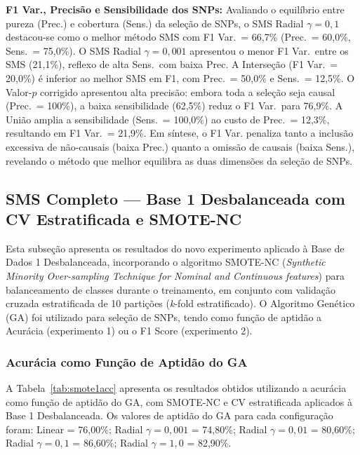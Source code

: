 \documentclass[12pt,a4paper]{article}
\newcommand{\novo}[1]{\textcolor{corNova}{#1}}
\begin{document}
\novo{\textbf{F1 Var., Precisão e Sensibilidade dos SNPs:} Avaliando o equilíbrio entre pureza (Prec.) e cobertura (Sens.) da seleção de SNPs, o SMS Radial $\gamma=0{,}1$ destacou-se como o melhor método SMS com F1 Var.\ = 66,7\% (Prec.\ = 60,0\%, Sens.\ = 75,0\%). O SMS Radial $\gamma=0{,}001$ apresentou o menor F1 Var.\ entre os SMS (21,1\%), reflexo de alta Sens.\ com baixa Prec. A Interseção (F1 Var.\ = 20,0\%) é inferior ao melhor SMS em F1, com Prec.\ = 50,0\% e Sens.\ = 12,5\%. O Valor-$p$ corrigido apresentou alta precisão: embora toda a seleção seja causal (Prec.\ = 100\%), a baixa sensibilidade (62,5\%) reduz o F1 Var.\ para 76,9\%. A União amplia a sensibilidade (Sens.\ = 100,0\%) ao custo de Prec.\ = 12,3\%, resultando em F1 Var.\ = 21,9\%. Em síntese, o F1 Var. penaliza tanto a inclusão excessiva de não-causais (baixa Prec.) quanto a omissão de causais (baixa Sens.), revelando o método que melhor equilibra as duas dimensões da seleção de SNPs.}
\subsection{\novo{SMS Completo --- Base 1 Desbalanceada com CV Estratificada e SMOTE-NC}}

\novo{Esta subseção apresenta os resultados do novo experimento aplicado à Base de Dados 1 Desbalanceada, incorporando o algoritmo SMOTE-NC (\textit{Synthetic Minority Over-sampling Technique for Nominal and Continuous features}) para balanceamento de classes durante o treinamento, em conjunto com validação cruzada estratificada de 10 partições (\textit{k}-fold estratificado). O Algoritmo Genético (GA) foi utilizado para seleção de SNPs, tendo como função de aptidão a Acurácia (experimento 1) ou o F1 Score (experimento 2).}

\subsubsection{\novo{Acurácia como Função de Aptidão do GA}}

\novo{A Tabela~\ref{tab:smote1acc} apresenta os resultados obtidos utilizando a acurácia como função de aptidão do GA, com SMOTE-NC e CV estratificada aplicados à Base 1 Desbalanceada. Os valores de aptidão do GA para cada configuração foram: Linear = 76,00\%; Radial $\gamma{=}0{,}001$ = 74,80\%; Radial $\gamma{=}0{,}01$ = 80,60\%; Radial $\gamma{=}0{,}1$ = 86,60\%; Radial $\gamma{=}1{,}0$ = 82,90\%.}
\end{document}
